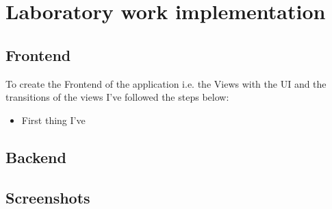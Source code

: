 \section{Laboratory work implementation}

\subsection{Frontend}

To create the Frontend of the application i.e. the Views with the UI and the transitions of the views I've followed the steps below:

\begin{itemize}
	\item First thing I've 
\end{itemize}

\subsection{Backend}


\subsection{Screenshots}


\clearpage